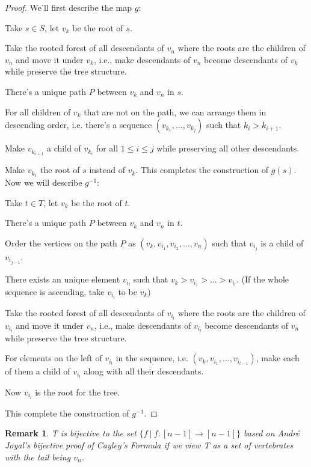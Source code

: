 \documentclass[11pt]{amsart}
\newtheorem{rema}[thm]{Remark}%
\begin{document}
\begin{proof}
    We'll first describe the map $g$:
    
    Take $s \in S$, let $v_k$ be the root of $s$.

    Take the rooted forest of all descendants of $v_n$ where the roots are the children of $v_n$ and move it under $v_k$, i.e., make descendants of $v_n$ become descendants of $v_k$ while preserve the tree structure.

    There's a unique path $P$ between $v_k$ and $v_n$ in $s$.

    For all children of $v_k$ that are not on the path, we can arrange them in descending order, i.e. there's a sequence $(v_{k_1},\dots,v_{k_j})$ such that $k_i > k_{i+1}$.

    Make $v_{k_{i+1}}$ a child of $v_{k_i}$ for all $1 \leq i \leq j$ while preserving all other descendants.
    
    Make $v_{k_1}$ the root of $s$ instead of $v_k$. This completes the construction of $g(s)$.\\

    Now we will describe $g^{-1}$:

    Take $t \in T$, let $v_k$ be the root of $t$.

    There's a unique path $P$ between $v_k$ and $v_n$ in $t$.

    Order the vertices on the path $P$ as $(v_k,v_{i_1},v_{i_2},\dots,v_n)$ such that $v_{i_j}$ is a child of $v_{i_{j-1}}$.

    There exists an unique element $v_{i_l}$ such that $v_k > v_{i_1} > \dots > v_{i_l}$. (If the whole sequence is ascending, take $v_{i_l}$ to be $v_k$)

    Take the rooted forest of all descendants of $v_{i_l}$ where the roots are the children of $v_{i_l}$ and move it under $v_n$, i.e., make descendants of $v_{i_l}$ become descendants of $v_n$ while preserve the tree structure.

    For elements on the left of $v_{i_l}$ in the sequence, i.e. $(v_k,v_{i_1},\dots,v_{i_{l-1}})$, make each of them a child of $v_{i_l}$ along with all their descendants.

    Now $v_{i_l}$ is the root for the tree.

    This complete the construction of $g^{-1}$.
\end{proof}

\begin{rema}
    T is bijective to the set $\{f \ | \ f:[n-1] \rightarrow [n-1]\}$ based on Andr\'e  Joyal's bijective proof of Cayley's Formula\cite{JOYAL19811} if we view T as a set of vertebrates with the tail being $v_n$.
\end{rema}
\end{document}
